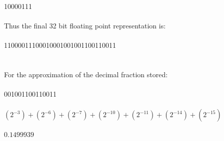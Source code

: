\documentclass{article}
\begin{document}
    \\
    10000111\\
    \\
    Thus the final 32 bit floating point representation is:\\
    \\
    11000011100010001001001100110011\\
    \\
    \\
    For the approximation of the decimal fraction stored:\\
    \\
    001001100110011\\
    \\
    $(2^{-3}) + (2^{-6}) + (2^{-7}) + (2^{-10}) + (2^{-11}) + (2^{-14}) + (2^{-15})$\\
    \\
    $0.1499939$
\end{document}
